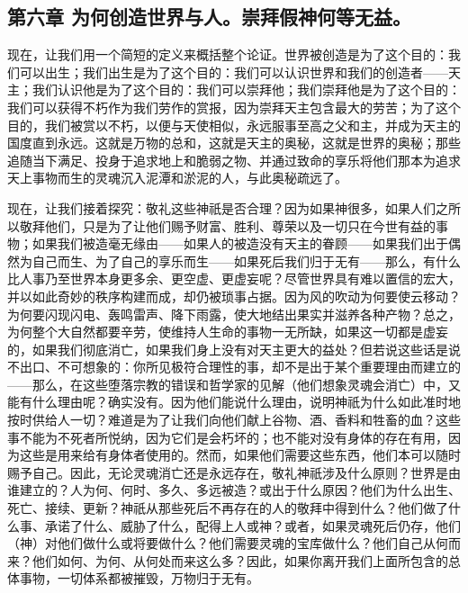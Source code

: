 \subsection{第六章 为何创造世界与人。崇拜假神何等无益。}

现在，让我们用一个简短的定义来概括整个论证。世界被创造是为了这个目的：我们可以出生；我们出生是为了这个目的：我们可以认识世界和我们的创造者——天主；我们认识他是为了这个目的：我们可以崇拜他；我们崇拜他是为了这个目的：我们可以获得不朽作为我们劳作的赏报，因为崇拜天主包含最大的劳苦；为了这个目的，我们被赏以不朽，以便与天使相似，永远服事至高之父和主，并成为天主的国度直到永远。这就是万物的总和，这就是天主的奥秘，这就是世界的奥秘；那些追随当下满足、投身于追求地上和脆弱之物、并通过致命的享乐将他们那本为追求天上事物而生的灵魂沉入泥潭和淤泥的人，与此奥秘疏远了。\par

现在，让我们接着探究：敬礼这些神祇是否合理？因为如果神很多，如果人们之所以敬拜他们，只是为了让他们赐予财富、胜利、尊荣以及一切只在今世有益的事物；如果我们被造毫无缘由——如果人的被造没有天主的眷顾——如果我们出于偶然为自己而生、为了自己的享乐而生——如果死后我们归于无有——那么，有什么比人事乃至世界本身更多余、更空虚、更虚妄呢？尽管世界具有难以置信的宏大，并以如此奇妙的秩序构建而成，却仍被琐事占据。因为风的吹动为何要使云移动？为何要闪现闪电、轰鸣雷声、降下雨露，使大地结出果实并滋养各种产物？总之，为何整个大自然都要辛劳，使维持人生命的事物一无所缺，如果这一切都是虚妄的，如果我们彻底消亡，如果我们身上没有对天主更大的益处？但若说这些话是说不出口、不可想象的：你所见极符合理性的事，却不是出于某个重要理由而建立的——那么，在这些堕落宗教的错误和哲学家的见解（他们想象灵魂会消亡）中，又能有什么理由呢？确实没有。因为他们能说什么理由，说明神祇为什么如此准时地按时供给人一切？难道是为了让我们向他们献上谷物、酒、香料和牲畜的血？这些事不能为不死者所悦纳，因为它们是会朽坏的；也不能对没有身体的存在有用，因为这些是用来给有身体者使用的。然而，如果他们需要这些东西，他们本可以随时赐予自己。因此，无论灵魂消亡还是永远存在，敬礼神祇涉及什么原则？世界是由谁建立的？人为何、何时、多久、多远被造？或出于什么原因？他们为什么出生、死亡、接续、更新？神祇从那些死后不再存在的人的敬拜中得到什么？他们做了什么事、承诺了什么、威胁了什么，配得上人或神？或者，如果灵魂死后仍存，他们（神）对他们做什么或将要做什么？他们需要灵魂的宝库做什么？他们自己从何而来？他们如何、为何、从何处而来这么多？因此，如果你离开我们上面所包含的总体事物，一切体系都被摧毁，万物归于无有。\par


